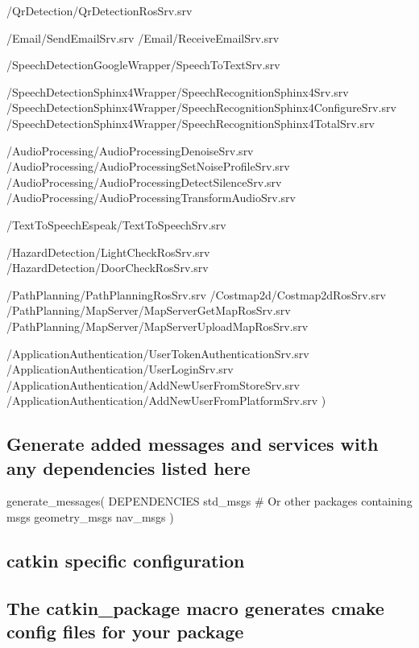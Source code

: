 /\-Qr\-Detection/\-Qr\-Detection\-Ros\-Srv.srv

/\-Email/\-Send\-Email\-Srv.srv /\-Email/\-Receive\-Email\-Srv.srv

/\-Speech\-Detection\-Google\-Wrapper/\-Speech\-To\-Text\-Srv.srv

/\-Speech\-Detection\-Sphinx4\-Wrapper/\-Speech\-Recognition\-Sphinx4\-Srv.srv /\-Speech\-Detection\-Sphinx4\-Wrapper/\-Speech\-Recognition\-Sphinx4\-Configure\-Srv.srv /\-Speech\-Detection\-Sphinx4\-Wrapper/\-Speech\-Recognition\-Sphinx4\-Total\-Srv.srv

/\-Audio\-Processing/\-Audio\-Processing\-Denoise\-Srv.srv /\-Audio\-Processing/\-Audio\-Processing\-Set\-Noise\-Profile\-Srv.srv /\-Audio\-Processing/\-Audio\-Processing\-Detect\-Silence\-Srv.srv /\-Audio\-Processing/\-Audio\-Processing\-Transform\-Audio\-Srv.srv

/\-Text\-To\-Speech\-Espeak/\-Text\-To\-Speech\-Srv.srv

/\-Hazard\-Detection/\-Light\-Check\-Ros\-Srv.srv /\-Hazard\-Detection/\-Door\-Check\-Ros\-Srv.srv

/\-Path\-Planning/\-Path\-Planning\-Ros\-Srv.srv /\-Costmap2d/\-Costmap2d\-Ros\-Srv.srv /\-Path\-Planning/\-Map\-Server/\-Map\-Server\-Get\-Map\-Ros\-Srv.srv /\-Path\-Planning/\-Map\-Server/\-Map\-Server\-Upload\-Map\-Ros\-Srv.srv

/\-Application\-Authentication/\-User\-Token\-Authentication\-Srv.srv /\-Application\-Authentication/\-User\-Login\-Srv.srv /\-Application\-Authentication/\-Add\-New\-User\-From\-Store\-Srv.srv /\-Application\-Authentication/\-Add\-New\-User\-From\-Platform\-Srv.srv )

\subsection*{Generate added messages and services with any dependencies listed here}

generate\-\_\-messages( D\-E\-P\-E\-N\-D\-E\-N\-C\-I\-E\-S std\-\_\-msgs \# Or other packages containing msgs geometry\-\_\-msgs nav\-\_\-msgs )

\subparagraph*{}

\subsection*{catkin specific configuration}

\subparagraph*{}

\subsection*{The catkin\-\_\-package macro generates cmake config files for your package}

